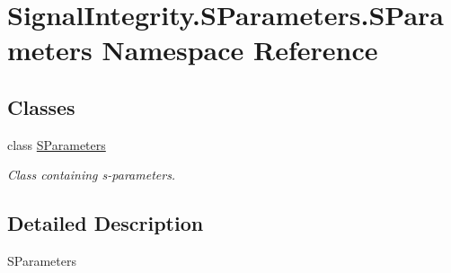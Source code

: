 \hypertarget{namespaceSignalIntegrity_1_1SParameters_1_1SParameters}{}\section{Signal\+Integrity.\+S\+Parameters.\+S\+Parameters Namespace Reference}
\label{namespaceSignalIntegrity_1_1SParameters_1_1SParameters}
\subsection*{Classes}
\begin{DoxyCompactItemize}
\item 
class \hyperlink{classSignalIntegrity_1_1SParameters_1_1SParameters_1_1SParameters}{S\+Parameters}
\begin{DoxyCompactList}\small\item\em Class containing s-\/parameters. \end{DoxyCompactList}\end{DoxyCompactItemize}


\subsection{Detailed Description}
\begin{DoxyVerb}SParameters\end{DoxyVerb}
 